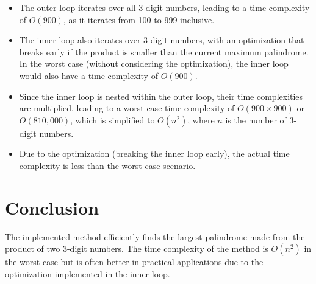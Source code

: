 \documentclass{article}
\begin{document}
\begin{itemize}
    \item The outer loop iterates over all 3-digit numbers, leading to a time complexity of \(O(900)\), as it iterates from 100 to 999 inclusive.
    \item The inner loop also iterates over 3-digit numbers, with an optimization that breaks early if the product is smaller than the current maximum palindrome. In the worst case (without considering the optimization), the inner loop would also have a time complexity of \(O(900)\).
    \item Since the inner loop is nested within the outer loop, their time complexities are multiplied, leading to a worst-case time complexity of \(O(900 \times 900)\) or \(O(810,000)\), which is simplified to \(O(n^2)\), where \(n\) is the number of 3-digit numbers.
    \item Due to the optimization (breaking the inner loop early), the actual time complexity is less than the worst-case scenario.
\end{itemize}

\section*{Conclusion}
The implemented method efficiently finds the largest palindrome made from the product of two 3-digit numbers. The time complexity of the method is \(O(n^2)\) in the worst case but is often better in practical applications due to the optimization implemented in the inner loop.
\end{document}
